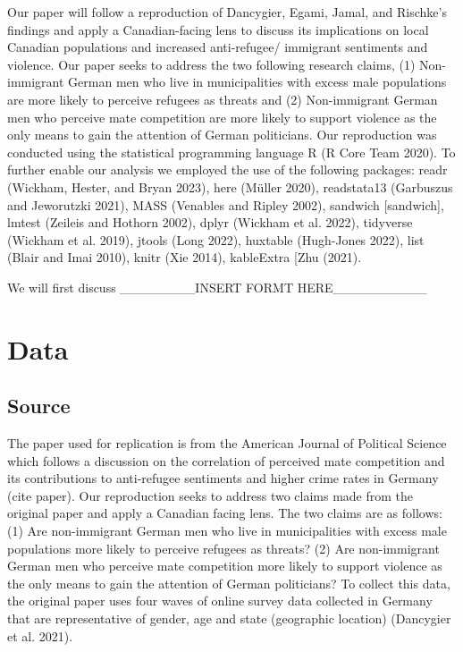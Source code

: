 \documentclass[
]{article}
\begin{document}
Our paper will follow a reproduction of Dancygier, Egami, Jamal, and
Rischke's findings and apply a Canadian-facing lens to discuss its
implications on local Canadian populations and increased anti-refugee/
immigrant sentiments and violence. Our paper seeks to address the two
following research claims, (1) Non-immigrant German men who live in
municipalities with excess male populations are more likely to perceive
refugees as threats and (2) Non-immigrant German men who perceive mate
competition are more likely to support violence as the only means to
gain the attention of German politicians. Our reproduction was conducted
using the statistical programming language R (R Core Team 2020). To
further enable our analysis we employed the use of the following
packages: readr (Wickham, Hester, and Bryan 2023), here (Müller 2020),
readstata13 (Garbuszus and Jeworutzki 2021), MASS (Venables and Ripley
2002), sandwich {[}sandwich{]}, lmtest (Zeileis and Hothorn 2002), dplyr
(Wickham et al. 2022), tidyverse (Wickham et al. 2019), jtools (Long
2022), huxtable (Hugh-Jones 2022), list (Blair and Imai 2010), knitr
(Xie 2014), kableExtra {[}Zhu (2021).

We will first discuss \_\_\_\_\_\_\_\_INSERT FORMT
HERE\_\_\_\_\_\_\_\_\_\_

\hypertarget{data}{%
\section{Data}\label{data}}

\hypertarget{source}{%
\subsection{Source}\label{source}}

The paper used for replication is from the American Journal of Political
Science which follows a discussion on the correlation of perceived mate
competition and its contributions to anti-refugee sentiments and higher
crime rates in Germany (cite paper). Our reproduction seeks to address
two claims made from the original paper and apply a Canadian facing
lens. The two claims are as follows: (1) Are non-immigrant German men
who live in municipalities with excess male populations more likely to
perceive refugees as threats? (2) Are non-immigrant German men who
perceive mate competition more likely to support violence as the only
means to gain the attention of German politicians? To collect this data,
the original paper uses four waves of online survey data collected in
Germany that are representative of gender, age and state (geographic
location) (Dancygier et al. 2021).
\end{document}
